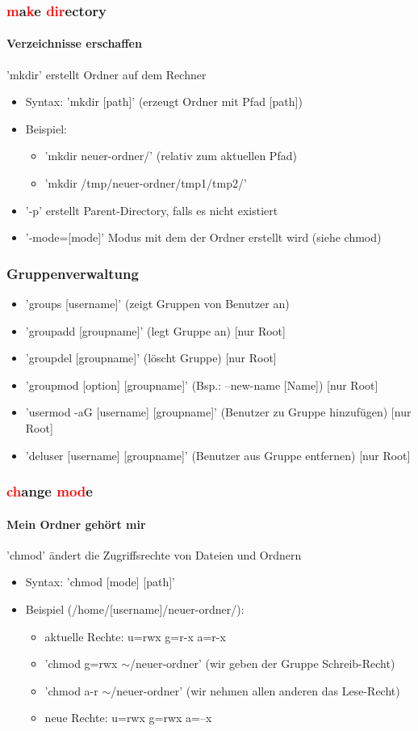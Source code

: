 \documentclass[12pt,utf8]{beamer}
\begin{document}
\begin{frame}
\frametitle{\textcolor{red}{m}a\textcolor{red}{k}e \textcolor{red}{dir}ectory}
\framesubtitle{Verzeichnisse erschaffen}
'mkdir' erstellt Ordner auf dem Rechner
\begin{itemize}[<+->]
	\item Syntax: 'mkdir [path]'   (erzeugt Ordner mit Pfad [path])
	\item Beispiel:
	\begin{itemize}[<+->]
		\item 'mkdir neuer-ordner/'    (relativ zum aktuellen Pfad)
		\item 'mkdir /tmp/neuer-ordner/tmp1/tmp2/'
	\end{itemize}
	\item '-p'   erstellt Parent-Directory, falls es nicht existiert
	\item '-mode=[mode]'  Modus mit dem der Ordner erstellt wird (siehe chmod)
\end{itemize}
\end{frame}

\begin{frame}
\frametitle{Gruppenverwaltung}
\begin{itemize}[<+->]
	\item 'groups [username]' (zeigt Gruppen von Benutzer an)
	\item 'groupadd [groupname]' (legt Gruppe an) [nur Root]
	\item 'groupdel [groupname]' (löscht Gruppe) [nur Root]
	\item 'groupmod [option] [groupname]' (Bsp.: --new-name [Name]) [nur Root]
	\item 'usermod -aG [username] [groupname]' (Benutzer zu Gruppe hinzufügen) [nur Root]
	\item 'deluser [username] [groupname]' (Benutzer aus Gruppe entfernen) [nur Root]
\end{itemize}
\end{frame}

\begin{frame}
\frametitle{\textcolor{red}{ch}ange \textcolor{red}{mod}e}
\framesubtitle{Mein Ordner gehört mir}
'chmod' ändert die Zugriffsrechte von Dateien und Ordnern
\begin{itemize}[<+->]
	\item Syntax: 'chmod [mode] [path]'
	\item Beispiel (/home/[username]/neuer-ordner/):
	\begin{itemize}[<+->]
		\item aktuelle Rechte: u=rwx g=r-x a=r-x
		\item 'chmod g=rwx $\sim$/neuer-ordner' (wir geben der Gruppe Schreib-Recht)
		\item 'chmod a-r $\sim$/neuer-ordner' (wir nehmen allen anderen das Lese-Recht)
		\item neue Rechte: u=rwx g=rwx a=--x
	\end{itemize}
\end{itemize}
\end{frame}
\end{document}
